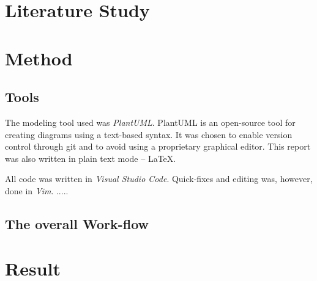 \documentclass[a4paper]{scrartcl}
\begin{document}
\section{Literature Study}

\clearpage
\section{Method}
\label{sec:method}


\subsection*{Tools}
The modeling tool used was \emph{PlantUML}.
PlantUML is an open-source tool for creating diagrams using a text-based
syntax.
It was chosen to enable version control through git and to avoid using a
proprietary graphical editor.
This report was also written in plain text mode -- \LaTeX.

All code was written in \emph{Visual Studio Code}.
Quick-fixes and editing was, however, done in \emph{Vim}.
.....

\subsection*{The overall Work-flow}

\pagebreak
\section{Result}


\end{document}
